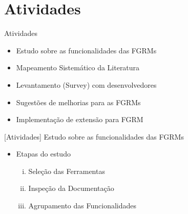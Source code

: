 \documentclass[t,14pt,mathserif]{beamer}
\begin{document}
\section{Atividades}

\begin{frame}{Atividades}

    \begin{itemize}
        \item Estudo sobre as funcionalidades das FGRMs
        \item Mapeamento Sistemático da Literatura~\cite{Petersen2008}
        \item Levantamento (Survey) com
              desenvolvedores~\cite{wohlin2012experimentation}
        \item Sugestões de melhorias para as FGRMs
        \item Implementação de extensão para FGRM
    \end{itemize}
\end{frame}

\begin{frame}{[Atividades] Estudo sobre as funcionalidades das FGRMs}
    \begin{itemize}
        \item Etapas do estudo
            \begin{enumerate}[(i)]
                \item Seleção das Ferramentas
                \item Inspeção da Documentação
                \item Agrupamento das Funcionalidades
            \end{enumerate}
    \end{itemize}
\end{frame}
\end{document}
